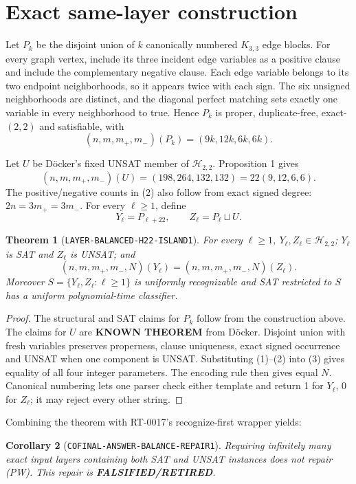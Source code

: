 \documentclass[11pt]{article}
\newtheorem{theorem}{Theorem}
\newtheorem{corollary}[theorem]{Corollary}
\newcommand{\Htwo}{\mathcal H_{2,2}}
\newcommand{\KNOWN}{\textbf{KNOWN THEOREM}}
\newcommand{\RETIRED}{\textbf{FALSIFIED/RETIRED}}
\begin{document}
\section{Exact same-layer construction}

Let $P_k$ be the disjoint union of $k$ canonically numbered $K_{3,3}$ edge
blocks.  For every graph vertex, include its three incident edge variables as
a positive clause and include the complementary negative clause.  Each edge
variable belongs to its two endpoint neighborhoods, so it appears twice with
each sign.  The six unsigned neighborhoods are distinct, and the diagonal
perfect matching sets exactly one variable in every neighborhood to true.
Hence $P_k$ is proper, duplicate-free, exact-$(2,2)$ and satisfiable, with
\[
 (n,m,m_+,m_-)(P_k)=(9k,12k,6k,6k).
 \tag{1}
\]

Let $U$ be D\"ocker's fixed UNSAT member of $\Htwo$.  Proposition 1 gives
\[
 (n,m,m_+,m_-)(U)=(198,264,132,132)=22(9,12,6,6).
 \tag{2}
\]
The positive/negative counts in (2) also follow from exact signed degree:
$2n=3m_+=3m_-$.  For every $\ell\ge1$, define
\[
 Y_\ell=P_{\ell+22},\qquad Z_\ell=P_\ell\sqcup U.
 \tag{3}
\]

\begin{theorem}[\texttt{LAYER-BALANCED-H22-ISLAND1}]
For every $\ell\ge1$, $Y_\ell,Z_\ell\in\Htwo$; $Y_\ell$ is SAT and
$Z_\ell$ is UNSAT; and
\[
 (n,m,m_+,m_-,N)(Y_\ell)=(n,m,m_+,m_-,N)(Z_\ell).
 \tag{4}
\]
Moreover $S=\{Y_\ell,Z_\ell:\ell\ge1\}$ is uniformly recognizable and SAT
restricted to $S$ has a uniform polynomial-time classifier.
\end{theorem}

\begin{proof}
The structural and SAT claims for $P_k$ follow from the construction above.
The claims for $U$ are \KNOWN{} from D\"ocker.  Disjoint union with fresh
variables preserves properness, clause uniqueness, exact signed occurrence
and UNSAT when one component is UNSAT.  Substituting (1)--(2) into (3) gives
equality of all four integer parameters.  The encoding rule then gives equal
$N$.  Canonical numbering lets one parser check either template and return 1
for $Y_\ell$, 0 for $Z_\ell$; it may reject every other string.
\end{proof}

Combining the theorem with RT-0017's recognize-first wrapper yields:

\begin{corollary}[\texttt{COFINAL-ANSWER-BALANCE-REPAIR1}]
Requiring infinitely many exact input layers containing both SAT and UNSAT
instances does not repair (PW).  This repair is \RETIRED{}.
\end{corollary}
\end{document}
